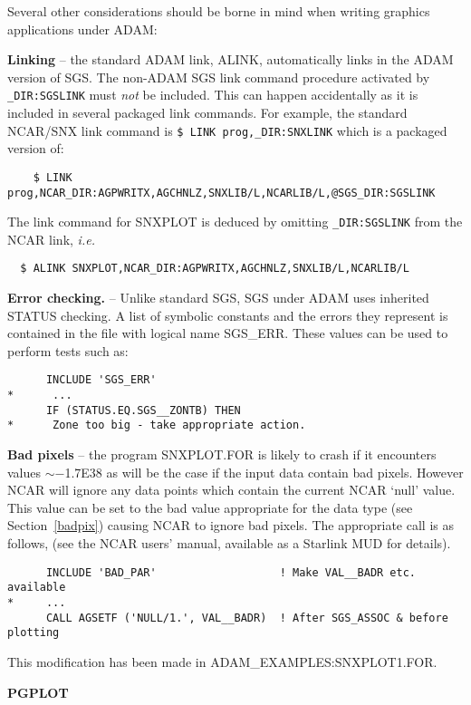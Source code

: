 Several other considerations should be borne in mind when writing graphics 
applications under ADAM:

{\bf Linking} -- the standard ADAM link, ALINK, 
automatically links in the ADAM version of SGS.
The non-ADAM SGS link command procedure activated by {\tt \@SGS\_DIR:SGSLINK} 
must {\sl not\/} be included.
This can happen accidentally as it is  included in several 
packaged link commands.
For example, the standard NCAR/SNX link command is
{\tt  \$ LINK prog,\@NCAR\_DIR:SNXLINK}
which is a packaged version of:
\begin{verbatim}
    $ LINK prog,NCAR_DIR:AGPWRITX,AGCHNLZ,SNXLIB/L,NCARLIB/L,@SGS_DIR:SGSLINK
\end{verbatim}
\newpage
The link command for SNXPLOT is deduced by
omitting {\tt \@SGS\_DIR:SGSLINK} from the NCAR link, {\it i.e.}
\begin{verbatim}
  $ ALINK SNXPLOT,NCAR_DIR:AGPWRITX,AGCHNLZ,SNXLIB/L,NCARLIB/L
\end{verbatim}
{\bf Error checking.} -- Unlike standard SGS, SGS under ADAM 
uses inherited STATUS checking.
A list of symbolic constants and the errors they represent is contained in 
the file with logical name SGS\_ERR.
These values can be used to perform tests such as:
\begin{verbatim}
      INCLUDE 'SGS_ERR'
*      ...
      IF (STATUS.EQ.SGS__ZONTB) THEN
*      Zone too big - take appropriate action.
\end{verbatim}
{\bf Bad pixels} -- the program SNXPLOT.FOR is likely to 
crash if it encounters values $\sim-$1.7E38
as will be the case if the input data contain bad pixels.
However NCAR will ignore any data points which contain the current 
NCAR `null' value.
This value can be set to the bad value appropriate for the data type
(see Section~\ref{badpix}) causing NCAR to ignore bad pixels.
The appropriate call is as follows, (see the NCAR users' manual, 
available as a Starlink MUD for details).
\begin{verbatim}
      INCLUDE 'BAD_PAR'                   ! Make VAL__BADR etc. available
*     ...                             
      CALL AGSETF ('NULL/1.', VAL__BADR)  ! After SGS_ASSOC & before plotting 
\end{verbatim}
This modification has been made in ADAM\_EXAMPLES:SNXPLOT1.FOR.


{\bigskip\large\bf PGPLOT}

